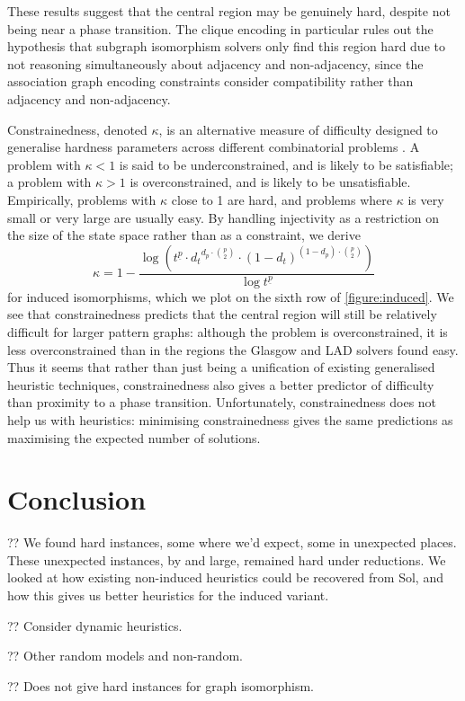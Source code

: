 \documentclass[letterpaper]{article}
\begin{document}
These results suggest that the central region may be genuinely hard, despite not being near a phase
transition. The clique encoding in particular rules out the hypothesis that subgraph isomorphism
solvers only find this region hard due to not reasoning simultaneously about adjacency and
non-adjacency, since the association graph encoding constraints consider compatibility rather than
adjacency and non-adjacency.

Constrainedness, denoted $\kappa$, is an alternative measure of difficulty designed to generalise
hardness parameters across different combinatorial problems \citep{Gent:1996:Kappa}. A problem with
$\kappa < 1$ is said to be underconstrained, and is likely to be satisfiable; a problem with $\kappa
> 1$ is overconstrained, and is likely to be unsatisfiable. Empirically, problems with $\kappa$
close to 1 are hard, and problems where $\kappa$ is very small or very large are usually easy. By
handling injectivity as a restriction on the size of the state space rather than as a constraint, we
derive \[ \kappa = 1 - \frac{\log \left( t^{\underline{p}} \cdot {d_t}^{d_p \cdot \binom{p}{2}} \cdot {(1 -
d_{t})}^{(1 - d_{p}) \cdot \binom{p}{2}} \right)}{\log t^{\underline{p}}}\] for induced isomorphisms, which
we plot on the sixth row of \cref{figure:induced}. We see that constrainedness predicts that the
central region will still be relatively difficult for larger pattern graphs: although the problem is
overconstrained, it is less overconstrained than in the regions the Glasgow and LAD solvers found easy.
Thus it seems that rather than just being a unification of existing generalised heuristic
techniques, constrainedness also gives a better predictor of difficulty than proximity to a phase
transition.  Unfortunately, constrainedness does not help us with heuristics: minimising
constrainedness gives the same predictions as maximising the expected number of solutions.

\section{Conclusion}

?? We found hard instances, some where we'd expect, some in unexpected places. These unexpected
instances, by and large, remained hard under reductions. We looked at how existing non-induced
heuristics could be recovered from Sol, and how this gives us better heuristics for the induced
variant.

?? Consider dynamic heuristics.

?? Other random models and non-random.

?? Does not give hard instances for graph isomorphism.

% 



\end{document}
